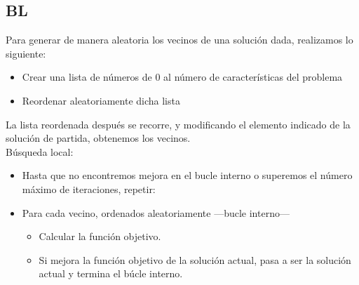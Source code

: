 \subsection{BL}
Para generar de manera aleatoria los vecinos de una solución dada, realizamos lo siguiente:
\begin{itemize}
\item Crear una lista de números de 0 al número de características del problema
\item Reordenar aleatoriamente dicha lista
\end{itemize} 
La lista reordenada después se recorre, y modificando el elemento indicado de la solución de partida, obtenemos los vecinos.\\
Búsqueda local:
\begin{itemize}
\item Hasta que no encontremos mejora en el bucle interno o superemos el número máximo de iteraciones, repetir:
\item Para cada vecino, ordenados aleatoriamente ---bucle interno---
\begin{itemize}
\item Calcular la función objetivo.
\item Si mejora la función objetivo de la solución actual, pasa a ser la solución actual y termina el búcle interno.
\end{itemize} 
\end{itemize} 
\newpage
